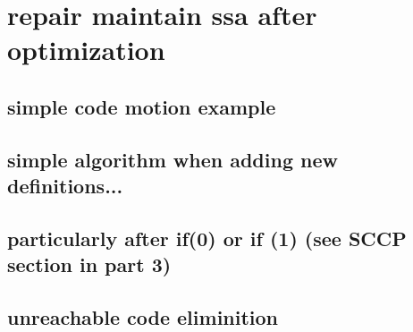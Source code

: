 \chapter{repair maintain ssa after optimization}


\section{simple code motion example}
\section{simple algorithm when adding new definitions...}
\section{particularly after if(0) or if (1) (see SCCP section in part 3)}
\section{unreachable code eliminition}


